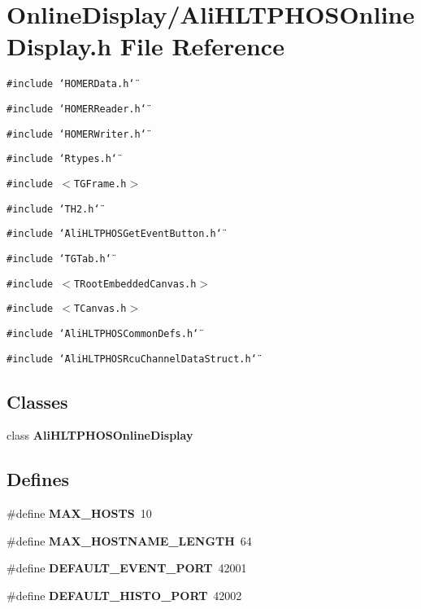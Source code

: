 \section{Online\-Display/Ali\-HLTPHOSOnline\-Display.h File Reference}
\label{AliHLTPHOSOnlineDisplay_8h}


{\tt \#include \char`\"{}HOMERData.h\char`\"{}}\par
{\tt \#include \char`\"{}HOMERReader.h\char`\"{}}\par
{\tt \#include \char`\"{}HOMERWriter.h\char`\"{}}\par
{\tt \#include \char`\"{}Rtypes.h\char`\"{}}\par
{\tt \#include $<$TGFrame.h$>$}\par
{\tt \#include \char`\"{}TH2.h\char`\"{}}\par
{\tt \#include \char`\"{}Ali\-HLTPHOSGet\-Event\-Button.h\char`\"{}}\par
{\tt \#include \char`\"{}TGTab.h\char`\"{}}\par
{\tt \#include $<$TRoot\-Embedded\-Canvas.h$>$}\par
{\tt \#include $<$TCanvas.h$>$}\par
{\tt \#include \char`\"{}Ali\-HLTPHOSCommon\-Defs.h\char`\"{}}\par
{\tt \#include \char`\"{}Ali\-HLTPHOSRcu\-Channel\-Data\-Struct.h\char`\"{}}\par
\subsection*{Classes}
\begin{CompactItemize}
\item 
class {\bf Ali\-HLTPHOSOnline\-Display}
\end{CompactItemize}
\subsection*{Defines}
\begin{CompactItemize}
\item 
\#define {\bf MAX\_\-HOSTS}\ 10
\item 
\#define {\bf MAX\_\-HOSTNAME\_\-LENGTH}\ 64
\item 
\#define {\bf DEFAULT\_\-EVENT\_\-PORT}\ 42001
\item 
\#define {\bf DEFAULT\_\-HISTO\_\-PORT}\ 42002
\end{CompactItemize}


